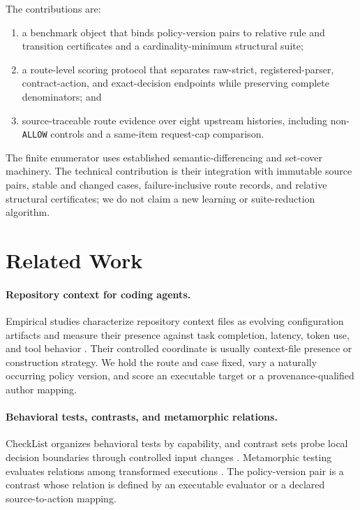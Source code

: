\documentclass[10pt]{article}
\newcommand{\allow}{\texttt{ALLOW}}
\begin{document}
The contributions are:
\begin{enumerate}[leftmargin=*]
  \item a benchmark object that binds policy-version pairs to relative rule and transition
  certificates and a cardinality-minimum structural suite;
  \item a route-level scoring protocol that separates raw-strict, registered-parser,
  contract-action, and exact-decision endpoints while preserving complete denominators; and
  \item source-traceable route evidence over eight upstream histories, including non-\allow{}
  controls and a same-item request-cap comparison.
\end{enumerate}
The finite enumerator uses established semantic-differencing and set-cover machinery. The technical
contribution is their integration with immutable source pairs, stable and changed cases,
failure-inclusive route records, and relative structural certificates; we do not claim a new
learning or suite-reduction algorithm.

\section{Related Work}

\paragraph{Repository context for coding agents.}
Empirical studies characterize repository context files as evolving configuration artifacts and
measure their presence against task completion, latency, token use, and tool behavior
\cite{mohsenimofidi2026context,chatlatanagulchai2025agentreadmes,lulla2026agentsmd,
gloaguen2026agentsmd,khatri2026contextfiles}. Their controlled coordinate is usually context-file
presence or construction strategy. We hold the route and case fixed, vary a naturally occurring
policy version, and score an executable target or a provenance-qualified author mapping.

\paragraph{Behavioral tests, contrasts, and metamorphic relations.}
CheckList organizes behavioral tests by capability, and contrast sets probe local decision
boundaries through controlled input changes \cite{ribeiro2020checklist,gardner2020contrastsets}.
Metamorphic testing evaluates relations among transformed executions \cite{chan1998metamorphic}.
The policy-version pair is a contrast whose relation is defined by an executable evaluator or a
declared source-to-action mapping.
\end{document}
